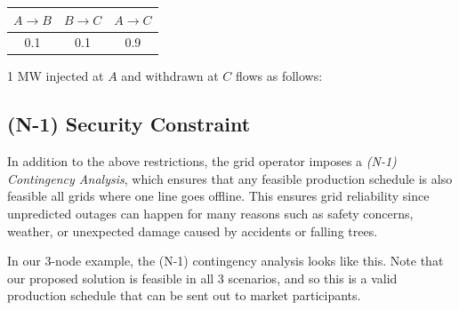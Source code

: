 \documentclass[11pt]{article}
\begin{document}
\begin{center}
\begin{tabular}{ccc}
    \toprule
    $A \rightarrow B$ & $B \rightarrow C$ & $A \rightarrow C$ \\
    \midrule
    0.1 & 0.1 & 0.9 \\
    \bottomrule
\end{tabular}
\end{center}

\vspace{0.2em}
1 MW injected at $A$ and withdrawn at $C$ flows as follows:

\begin{center}
\end{center}

\newpage

\subsection{(N-1) Security Constraint}

In addition to the above restrictions, the grid operator imposes a \textit{(N-1) Contingency Analysis}, which ensures that any feasible production schedule is also feasible all grids where one line goes offline. This ensures grid reliability since unpredicted outages can happen for many reasons such as safety concerns, weather, or unexpected damage caused by accidents or falling trees.

In our 3-node example, the (N-1) contingency analysis looks like this. Note that our proposed solution is feasible in all 3 scenarios, and so this is a valid production schedule that can be sent out to market participants.
\end{document}
